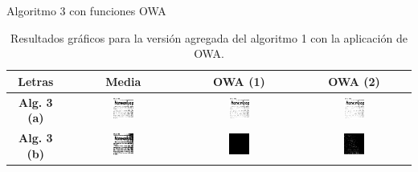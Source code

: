 \documentclass{beamer}
\theoremstyle{plain} %
\theoremstyle{definition}
\newcommand{\bb}{\bfseries}
\begin{document}
\begin{frame}{Algoritmo 3 con funciones OWA}
  \begin{table}
  \centering
  \begin{tabular}{c||c|c|c}
Letras                               &\bb Media&\bb OWA (1)&\bb OWA (2)\\\hline\hline
\bb Alg. 3 (a)  &
\includegraphics[width=0.2\textwidth]{img/res/e7/alg3aowa109.jpg} &
\includegraphics[width=0.2\textwidth]{img/res/e7/alg3aowa209.jpg} &
\includegraphics[width=0.2\textwidth]{img/res/e7/alg3aowa309.jpg} \\
\bb Alg. 3 (b)  &
\includegraphics[width=0.2\textwidth]{img/res/e7/alg3bowa109.jpg} &
\includegraphics[width=0.2\textwidth]{img/res/e7/alg3bowa209.jpg} &
\includegraphics[width=0.2\textwidth]{img/res/e7/alg3bowa309.jpg} \\\hline
  \end{tabular}
  \caption{Resultados gráficos para la versión agregada del algoritmo 1 con la aplicación de OWA.}
  \end{table}
\end{frame}
\end{document}
